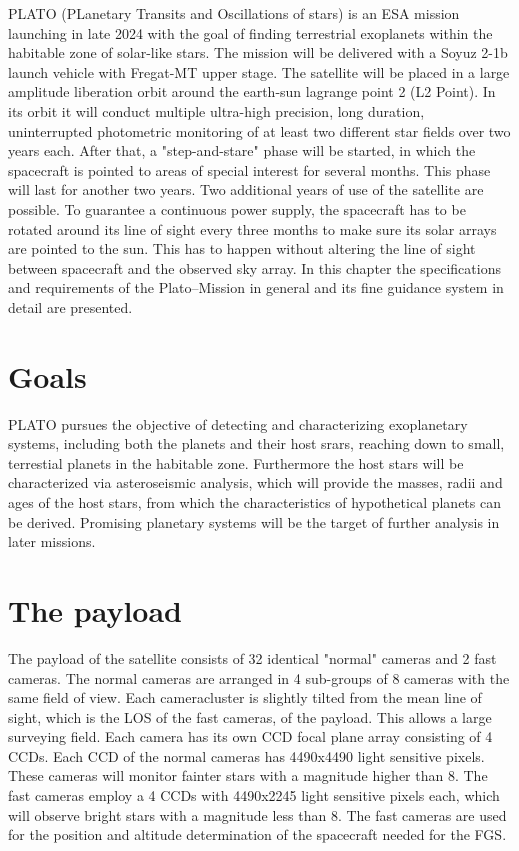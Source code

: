 PLATO (PLanetary Transits and Oscillations of stars) is an ESA mission launching in late 2024 with the goal of finding terrestrial exoplanets within the habitable zone of solar-like stars. The mission will be delivered with a Soyuz 2-1b launch vehicle with Fregat-MT upper stage. The satellite will be placed in a large amplitude liberation orbit around the earth-sun lagrange point 2 (L2 Point). In its orbit it will conduct multiple ultra-high precision, long duration, uninterrupted photometric monitoring of at least two different star fields over two years each. After that, a "step-and-stare" phase will be started, in which the spacecraft is pointed to areas of special interest for several months. This phase will last for another two years. Two additional years of use of the satellite are possible. To guarantee a continuous power supply, the spacecraft has to be rotated around its line of sight every three months to make sure its solar arrays are pointed to the sun. This has to happen without altering the line of sight between spacecraft and the observed sky array.
\newline
In this chapter the specifications and requirements of the Plato--Mission in general and its fine guidance system in detail are presented.
\section{Goals}
PLATO pursues the objective of detecting and characterizing exoplanetary systems, including both the planets and their host srars, reaching down to small, terrestial planets in the habitable zone. Furthermore the host stars will be characterized via asteroseismic analysis, which will provide the masses, radii and ages of the host stars, from which the characteristics of hypothetical planets can be derived. Promising planetary systems will be the target of further analysis in later missions. 
\section{The payload}
The payload of the satellite consists of 32 identical "normal" cameras and 2 fast cameras. The normal cameras are arranged in 4 sub-groups of 8 cameras with the same field of view. Each cameracluster is slightly tilted from the mean line of sight, which is the LOS of the fast cameras, of the payload. This allows a large surveying field.
\newline
Each camera has its own CCD focal plane array consisting of 4 CCDs. Each CCD of the normal cameras has 4490x4490 light sensitive pixels. These cameras will monitor fainter stars with a magnitude higher than 8. The fast cameras employ a 4 CCDs with 4490x2245 light sensitive pixels each, which will observe bright stars with a magnitude less than 8. The fast cameras are used for the position and altitude determination of the spacecraft needed for the FGS.   

